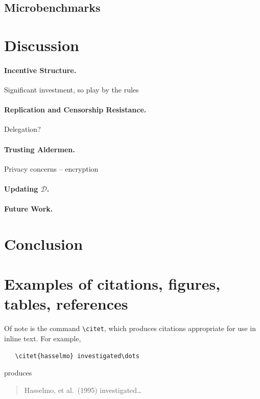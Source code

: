 \documentclass{article}
\begin{document}
\subsection{Microbenchmarks}

\section{Discussion}

\paragraph{Incentive Structure.} Significant investment, so play by the rules

\paragraph{Replication and Censorship Resistance.} Delegation?

\paragraph{Trusting Aldermen.} Privacy concerns -- encryption

\paragraph{Updating $\mathcal{D}$.}

\paragraph{Future Work.}

\section{Conclusion}

\section{Examples of citations, figures, tables, references}
\label{sec:others}
 \cite{permacoin-repurposing-bitcoin-work-for-data-preservation}

Of note is the command \verb+\citet+, which produces citations
appropriate for use in inline text.  For example,
\begin{verbatim}
   \citet{hasselmo} investigated\dots
\end{verbatim}
produces
\begin{quote}
  Hasselmo, et al.\ (1995) investigated\dots
\end{quote}
\end{document}
